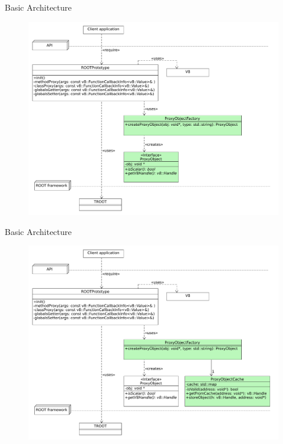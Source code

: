 \begin{frame}{Basic Architecture}
  \begin{figure}[htb]
    \centering
      \includegraphics[width=\textwidth, height=.85\textheight, keepaspectratio]{./resources/architecture/architecture_h4.pdf}
  \end{figure}
\end{frame}

\begin{frame}{Basic Architecture}
  \begin{figure}[htb]
    \centering
      \includegraphics[width=\textwidth, height=.85\textheight, keepaspectratio]{./resources/architecture/architecture_h5.pdf}
  \end{figure}
\end{frame}

